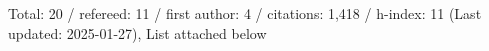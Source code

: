 Total: 20 / refereed: 11 / first author: 4 / citations: 1,418 / h-index: 11 (Last updated: 2025-01-27), List attached below